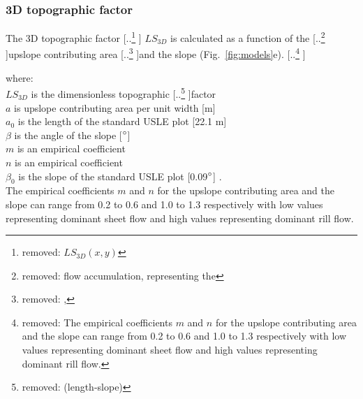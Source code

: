 \documentclass[gmd, manuscript]{copernicus}
\providecommand{\DIFadd}[1]{{\protect\color{blue} \sf #1}} %
\providecommand{\DIFdel}[1]{{\protect\color{red} [..\footnote{removed: #1} ]}} %
\providecommand{\DIFaddbegin}{} %
\providecommand{\DIFaddend}{} %
\providecommand{\DIFdelbegin}{} %
\providecommand{\DIFdelend}{} %
\begin{document}
\subsubsection{3D topographic factor}
The 3D topographic factor \DIFdelbegin \DIFdel{$LS_{3D}(x,y)$
}\DIFdelend \DIFaddbegin \DIFadd{$LS_{3D}$
}\DIFaddend is calculated as a function of the \DIFdelbegin \DIFdel{flow accumulation,
representing the }\DIFdelend upslope contributing area
\DIFdelbegin \DIFdel{,
}\DIFdelend and the slope (Fig.~\ref{fig:models}e). 
\DIFdelbegin \DIFdel{The empirical coefficients $m$ and $n$
for the upslope contributing area 
and the slope
can range from 0.2 to 0.6
and 1.0 to 1.3 respectively
with low values representing dominant sheet flow
and high values representing dominant rill flow.
}
\DIFdelend 
{\small
\noindent
where: \\
\noindent
\hspace*{0.5em} $LS_{3D}$ is the dimensionless topographic \DIFdelbegin \DIFdel{(length-slope) }\DIFdelend factor\\
\hspace*{0.5em} $a$ is upslope contributing area per unit width [\unit{m}]\\
\hspace*{0.5em} $a_0$ is the length of the standard USLE plot [22.1 \unit{m}]\\
\hspace*{0.5em} $\beta$ is the angle of the slope [$^{\circ}$]\\
\hspace*{0.5em} $m$ is an empirical coefficient\\
\hspace*{0.5em} $n$ is an empirical coefficient\\
\hspace*{0.5em} $\beta_0$ is the slope of the standard USLE plot [0.09$^{\circ}$]\DIFaddbegin \DIFadd{.}\DIFaddend \\
}
\DIFaddbegin \DIFadd{The empirical coefficients $m$ and $n$
for the upslope contributing area and the slope
can range from 0.2 to 0.6 and 1.0 to 1.3 respectively
with low values representing dominant sheet flow
and high values representing dominant rill flow.
}\DIFaddend %
\end{document}
